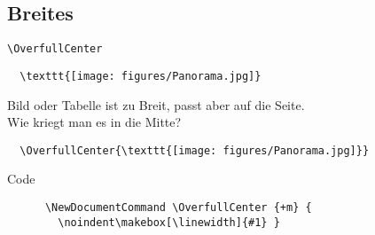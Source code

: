 \subsection{Breites}

\begin{frame}[fragile]{\texttt{\textbackslash OverfullCenter}}
  \begin{lstlisting}
  \texttt{[image: figures/Panorama.jpg]}
  \end{lstlisting}

  \vspace{5pt}

  Bild oder Tabelle ist zu Breit, passt aber auf die Seite.\\
  Wie kriegt man es in die Mitte?

  \vspace{5pt}
  \begin{lstlisting}
  \OverfullCenter{\texttt{[image: figures/Panorama.jpg]}}
  \end{lstlisting}


  \begin{block}{Code}
    \begin{lstlisting}
      \NewDocumentCommand \OverfullCenter {+m} {
        \noindent\makebox[\linewidth]{#1} }
    \end{lstlisting}
  \end{block}
\end{frame}

